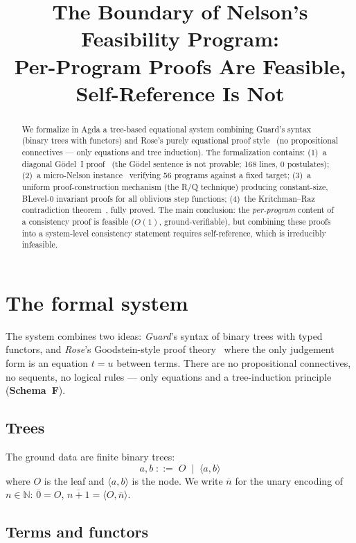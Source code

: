 \documentclass[11pt]{article}
\title{The Boundary of Nelson's Feasibility Program:\\
  Per-Program Proofs Are Feasible,\\
  Self-Reference Is Not}
\author{}
\date{}
\newcommand{\pair}[2]{\langle #1, #2 \rangle}
\newcommand{\SchemaF}{\textbf{Schema~F}}
\newcommand{\nat}[1]{\overline{#1}}
\begin{document}
\maketitle

\begin{abstract}
We formalize in Agda a tree-based equational system combining
Guard's syntax (binary trees with functors) and Rose's
purely equational proof style~\cite{rose1953} (no propositional
connectives --- only equations and tree induction).
The formalization contains:
(1)~a diagonal G\"odel~I proof~\cite{godel1931}
(the G\"odel sentence is not provable; 168 lines, 0 postulates);
(2)~a micro-Nelson instance~\cite{nelson1986} verifying 56
programs against a fixed target;
(3)~a uniform proof-construction mechanism (the R/Q technique)
producing constant-size, BLevel-0 invariant proofs for all
oblivious step functions;
(4)~the Kritchman--Raz contradiction theorem~\cite{kritchmanraz2010},
fully proved.
The main conclusion: the \emph{per-program} content of a consistency
proof is feasible ($O(1)$, ground-verifiable), but combining these
proofs into a system-level consistency statement requires
self-reference, which is irreducibly infeasible.
\end{abstract}

\section{The formal system}

The system combines two ideas: \emph{Guard}'s syntax of binary trees
with typed functors, and \emph{Rose}'s Goodstein-style proof
theory~\cite{rose1953} where the only judgement form is an equation
$t = u$ between terms.  There are no propositional connectives,
no sequents, no logical rules --- only equations and a tree-induction
principle (\SchemaF).

\subsection*{Trees}

The ground data are finite binary trees:
\[
  a, b \;::=\; O \;\mid\; \pair{a}{b}
\]
where $O$ is the leaf and $\pair{a}{b}$ is the node.
We write $\nat{n}$ for the unary encoding of $n \in \mathbb{N}$:
$\nat{0} = O$, $\nat{n+1} = \pair{O}{\nat{n}}$.

\subsection*{Terms and functors}
\end{document}
